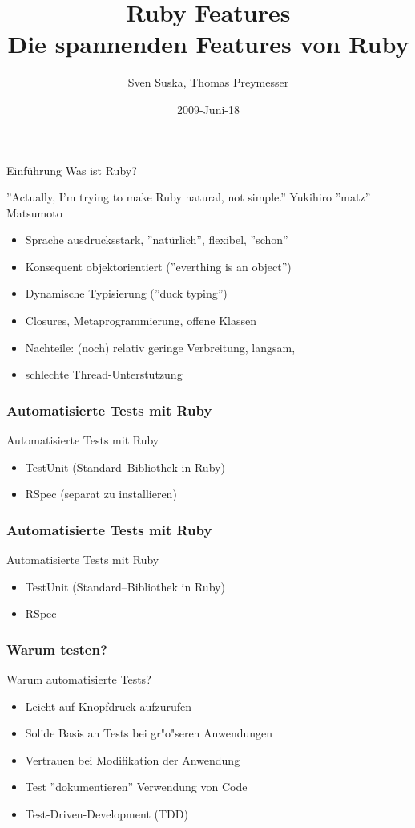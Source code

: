 \documentclass{beamer}
\title[Ruby]{Ruby Features\\Die spannenden Features von Ruby}
\author{Sven Suska, Thomas Preymesser}
\date{2009-Juni-18}
\begin{document}
\lstset{language=Ruby}
\begin{frame}
\titlepage
\end{frame}


\begin{frame}{Einführung}
Was ist Ruby?

''Actually, I'm trying to make Ruby natural, not simple.''
Yukihiro ''matz'' Matsumoto


\begin{itemize}
\pause \item Sprache ausdrucksstark, ''natürlich'', flexibel, ''schon''
\pause \item Konsequent objektorientiert (''everthing is an object'')
\pause \item Dynamische Typisierung (''duck typing'')
\pause \item Closures, Metaprogrammierung, offene Klassen
\pause \item Nachteile: (noch) relativ geringe Verbreitung, langsam, 
\pause \item schlechte Thread-Unterstutzung
\end{itemize}
\end{frame}

\begin{frame}
  \frametitle{Automatisierte Tests mit Ruby}
  Automatisierte Tests mit Ruby
  \begin{itemize}
    \item<1-> TestUnit (Standard--Bibliothek in Ruby)
    \item<2-> RSpec (separat zu installieren)
  \end{itemize}
\end{frame}

\begin{frame}
  \frametitle{Automatisierte Tests mit Ruby}
  Automatisierte Tests mit Ruby
  \begin{itemize}
    \item TestUnit (Standard--Bibliothek in Ruby)
    \pause
    \item RSpec 
  \end{itemize}
\end{frame}

\begin{frame}

 \frametitle{Warum testen?}
  Warum automatisierte Tests?
  \begin{itemize}
    \item Leicht auf Knopfdruck aufzurufen
    \item Solide Basis an Tests bei gr"o"seren Anwendungen
    \item Vertrauen bei Modifikation der Anwendung
    \item Test ''dokumentieren'' Verwendung von Code
    \item Test-Driven-Development (TDD)
  \end{itemize}
\end{frame}
\end{document}
